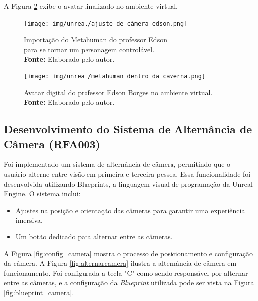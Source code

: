 A Figura \ref{fig:metahumanEdsonn} exibe o avatar finalizado no ambiente virtual.

\begin{figure}[H]
        \centering
\texttt{[image: img/unreal/ajuste de câmera edson.png]}
        \caption{Importação do Metahuman do professor Edson \\ para se tornar um personagem controlável. \\
            \textbf{Fonte:} Elaborado pelo autor.}
        \label{fig:metahumancamera}
\end{figure}

\begin{figure}[H]
        \centering
\texttt{[image: img/unreal/metahuman dentro da caverna.png]}
        \caption{Avatar digital do professor Edson Borges no ambiente virtual. \\
            \textbf{Fonte:} Elaborado pelo autor.}
        \label{fig:metahumanEdsonn}
\end{figure}


\subsection{Desenvolvimento do Sistema de Alternância de Câmera (RFA003)}
Foi implementado um sistema de alternância de câmera, permitindo que o usuário alterne entre visão em primeira e terceira pessoa. Essa funcionalidade foi desenvolvida utilizando Blueprints, a linguagem visual de programação da Unreal Engine. O sistema inclui:
\begin{itemize}
    \item Ajustes na posição e orientação das câmeras para garantir uma experiência imersiva.
    \item Um botão dedicado para alternar entre as câmeras.
\end{itemize}
A Figura \ref{fig:config_camera} mostra o processo de posicionamento e configuração da câmera. A Figura \ref{fig:alternarcamera} ilustra a alternância de câmera em funcionamento.
Foi configurada a tecla "C"  como sendo responsável por alternar entre as câmeras, e a configuração da \textit{Blueprint} utilizada pode ser vista na Figura \ref{fig:blueprint_camera}.

